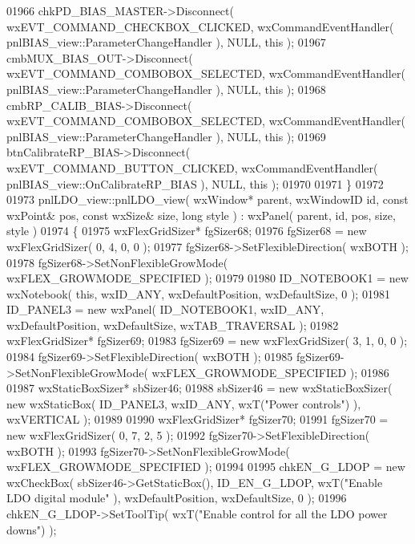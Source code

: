 \begin{DoxyCode}
01966     chkPD_BIAS_MASTER->Disconnect( wxEVT\_COMMAND\_CHECKBOX\_CLICKED, wxCommandEventHandler( 
      pnlBIAS_view::ParameterChangeHandler ), NULL, \textcolor{keyword}{this} );
01967     cmbMUX_BIAS_OUT->Disconnect( wxEVT\_COMMAND\_COMBOBOX\_SELECTED, wxCommandEventHandler( 
      pnlBIAS_view::ParameterChangeHandler ), NULL, \textcolor{keyword}{this} );
01968     cmbRP_CALIB_BIAS->Disconnect( wxEVT\_COMMAND\_COMBOBOX\_SELECTED, wxCommandEventHandler( 
      pnlBIAS_view::ParameterChangeHandler ), NULL, \textcolor{keyword}{this} );
01969     btnCalibrateRP_BIAS->Disconnect( wxEVT\_COMMAND\_BUTTON\_CLICKED, wxCommandEventHandler( 
      pnlBIAS_view::OnCalibrateRP_BIAS ), NULL, \textcolor{keyword}{this} );
01970     
01971 \}
01972 
01973 pnlLDO_view::pnlLDO_view( wxWindow* parent, wxWindowID \textcolor{keywordtype}{id}, \textcolor{keyword}{const} wxPoint& pos, \textcolor{keyword}{const} wxSize& 
      size, \textcolor{keywordtype}{long} style ) : wxPanel( parent, id, pos, size, style )
01974 \{
01975     wxFlexGridSizer* fgSizer68;
01976     fgSizer68 = \textcolor{keyword}{new} wxFlexGridSizer( 0, 4, 0, 0 );
01977     fgSizer68->SetFlexibleDirection( wxBOTH );
01978     fgSizer68->SetNonFlexibleGrowMode( wxFLEX\_GROWMODE\_SPECIFIED );
01979     
01980     ID_NOTEBOOK1 = \textcolor{keyword}{new} wxNotebook( \textcolor{keyword}{this}, wxID\_ANY, wxDefaultPosition, wxDefaultSize, 0 );
01981     ID_PANEL3 = \textcolor{keyword}{new} wxPanel( ID_NOTEBOOK1, wxID\_ANY, wxDefaultPosition, wxDefaultSize, wxTAB\_TRAVERSAL );
01982     wxFlexGridSizer* fgSizer69;
01983     fgSizer69 = \textcolor{keyword}{new} wxFlexGridSizer( 3, 1, 0, 0 );
01984     fgSizer69->SetFlexibleDirection( wxBOTH );
01985     fgSizer69->SetNonFlexibleGrowMode( wxFLEX\_GROWMODE\_SPECIFIED );
01986     
01987     wxStaticBoxSizer* sbSizer46;
01988     sbSizer46 = \textcolor{keyword}{new} wxStaticBoxSizer( \textcolor{keyword}{new} wxStaticBox( ID_PANEL3, wxID\_ANY, wxT(\textcolor{stringliteral}{"Power controls"}) ), 
      wxVERTICAL );
01989     
01990     wxFlexGridSizer* fgSizer70;
01991     fgSizer70 = \textcolor{keyword}{new} wxFlexGridSizer( 0, 7, 2, 5 );
01992     fgSizer70->SetFlexibleDirection( wxBOTH );
01993     fgSizer70->SetNonFlexibleGrowMode( wxFLEX\_GROWMODE\_SPECIFIED );
01994     
01995     chkEN_G_LDOP = \textcolor{keyword}{new} wxCheckBox( sbSizer46->GetStaticBox(), ID_EN_G_LDOP, wxT(\textcolor{stringliteral}{"Enable LDO digital module"}
      ), wxDefaultPosition, wxDefaultSize, 0 );
01996     chkEN_G_LDOP->SetToolTip( wxT(\textcolor{stringliteral}{"Enable control for all the LDO power downs"}) );

\end{DoxyCode}
